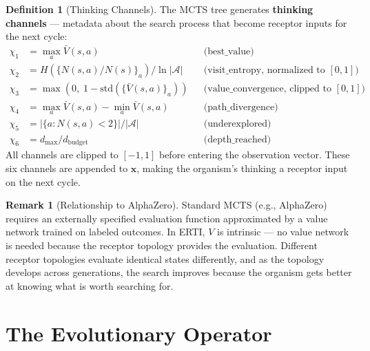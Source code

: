 \documentclass[12pt]{article}
\theoremstyle{definition}
\newtheorem{definition}{Definition}
\newtheorem{remark}{Remark}
\begin{document}
\begin{definition}[Thinking Channels]
The MCTS tree generates \textbf{thinking channels} --- metadata about the search process
that become receptor inputs for the next cycle:
\begin{align*}
\chi_1 &= \max_{a} \bar{V}(s,a) && \text{(best\_value)} \\
\chi_2 &= H(\{N(s,a)/N(s)\}_a) / \ln|\mathcal{A}| && \text{(visit\_entropy, normalized to $[0,1]$)} \\
\chi_3 &= \max\!\left(0,\; 1 - \text{std}(\{\bar{V}(s,a)\}_a)\right) && \text{(value\_convergence, clipped to $[0,1]$)} \\
\chi_4 &= \max_a \bar{V}(s,a) - \min_a \bar{V}(s,a) && \text{(path\_divergence)} \\
\chi_5 &= |\{a : N(s,a) < 2\}| / |\mathcal{A}| && \text{(underexplored)} \\
\chi_6 &= d_{\max} / d_{\text{budget}} && \text{(depth\_reached)}
\end{align*}
All channels are clipped to $[-1, 1]$ before entering the observation vector.
These six channels are appended to $\mathbf{x}$, making the organism's thinking
a receptor input on the next cycle.
\end{definition}

\begin{remark}[Relationship to AlphaZero]
Standard MCTS (e.g., AlphaZero) requires an externally specified evaluation function
approximated by a value network trained on labeled outcomes. In ERTI, $V$ is intrinsic ---
no value network is needed because the receptor topology provides the evaluation.
Different receptor topologies evaluate identical states differently, and as the topology
develops across generations, the search improves because the organism gets better at
knowing what is worth searching for.
\end{remark}

\section{The Evolutionary Operator}
\end{document}
